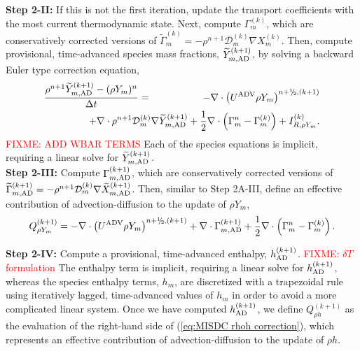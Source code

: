 {\bf Step 2-II:} If this is not the first iteration, update the transport coefficients with the most current thermodynamic state.
Next, compute $\Gamma_m^{(k)}$, which are conservatively corrected versions of 
$\widetilde\Gamma_m^{(k)} = - \rho^{n+1}\mathcal D_m^{(k)}\nabla X_m^{(k)}$.
Then, compute provisional, time-advanced species mass fractions, $\widetilde Y_{m,{\rm AD}}^{(k+1)}$, by solving a backward Euler type
correction equation,
\begin{eqnarray}
\frac{\rho^{n+1}\widetilde Y_{m,{\rm AD}}^{(k+1)} - (\rho Y_m)^n}{\Delta t} &=& -\nabla\cdot\left(\uadv\rho Y_m\right)^{n+\myhalf,(k+1)}\nonumber\\
&&\hspace{-2.5cm}+ \nabla\cdot\rho^{n+1}\mathcal D_m^{(k)}\nabla\widetilde Y_{m,{\rm AD}}^{(k+1)}
+ \half\nabla\cdot\left(\Gamma_m^n - \Gamma_m^{(k)}\right)  + I_{R,\rho Y_m}^{(k)}.
\end{eqnarray}
\textcolor{red}{FIXME: ADD WBAR TERMS}
Each of the species equations is implicit, requiring a linear solve for $\widetilde Y_{m,{\rm AD}}^{(k+1)}$.\\

{\bf Step 2-III:} Compute $\Gamma_{m,{\rm AD}}^{(k+1)}$, which are conservatively corrected versions of 
$\widetilde\Gamma_{m,{\rm AD}}^{(k+1)} = -\rho^{n+1}\mathcal D_m^{(k)}\nabla\widetilde X_{m,{\rm AD}}^{(k+1)}$.
Then, similar to Step 2A-III, define an effective contribution of advection-diffusion to the update of $\rho Y_m$,
\begin{equation}
Q_{\rho Y_m}^{(k+1)} = -\nabla\cdot\left(\uadv\rho Y_m\right)^{n+\myhalf,(k+1)} + \nabla\cdot\Gamma_{m,{\rm AD}}^{(k+1)} + \half\nabla\cdot\left(\Gamma_m^n - \Gamma_m^{(k)}\right).
\end{equation}

{\bf Step 2-IV:} Compute a provisional, time-advanced enthalpy, $h_{\rm AD}^{(k+1)}$.  \textcolor{red}{FIXME: $\delta T$ formulation}
The enthalpy term is implicit, requiring a linear solve for $h_{\rm AD}^{(k+1)}$, whereas the 
species enthalpy terms, $h_m$, are discretized with a trapezoidal rule using iteratively lagged, 
time-advanced values of $h_m$ in order to avoid a more complicated linear system.
Once we have computed $h_{\rm AD}^{(k+1)}$, we define
$Q_{\rho h}^{(k+1)}$ as the evaluation of the right-hand side of (\ref{eq:MISDC rhoh correction}),
which represents an effective contribution of advection-diffusion to the update of $\rho h$.\\

